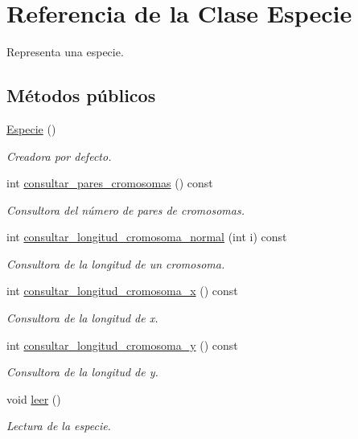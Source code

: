 \hypertarget{class_especie}{}\section{Referencia de la Clase Especie}
\label{class_especie}


Representa una especie.  


\subsection*{Métodos públicos}
\begin{DoxyCompactItemize}
\item 
\hyperlink{class_especie_a272c2488719cc9874b2f174906675b3d}{Especie} ()
\begin{DoxyCompactList}\small\item\em Creadora por defecto. \end{DoxyCompactList}\item 
int \hyperlink{class_especie_a163bb40ff71d1792c7dddb13e62261ef}{consultar\+\_\+pares\+\_\+cromosomas} () const
\begin{DoxyCompactList}\small\item\em Consultora del número de pares de cromosomas. \end{DoxyCompactList}\item 
int \hyperlink{class_especie_a54799405b10e46e0ea5723b72c7aa999}{consultar\+\_\+longitud\+\_\+cromosoma\+\_\+normal} (int i) const
\begin{DoxyCompactList}\small\item\em Consultora de la longitud de un cromosoma. \end{DoxyCompactList}\item 
int \hyperlink{class_especie_ab2da80d81baf641f18d7621838039e76}{consultar\+\_\+longitud\+\_\+cromosoma\+\_\+x} () const
\begin{DoxyCompactList}\small\item\em Consultora de la longitud de x. \end{DoxyCompactList}\item 
int \hyperlink{class_especie_a410b95f623a7013b96ec20039ca584b3}{consultar\+\_\+longitud\+\_\+cromosoma\+\_\+y} () const
\begin{DoxyCompactList}\small\item\em Consultora de la longitud de y. \end{DoxyCompactList}\item 
void \hyperlink{class_especie_a2335c9ddc4757e964d78e6267304cf52}{leer} ()
\begin{DoxyCompactList}\small\item\em Lectura de la especie. \end{DoxyCompactList}\end{DoxyCompactItemize}


